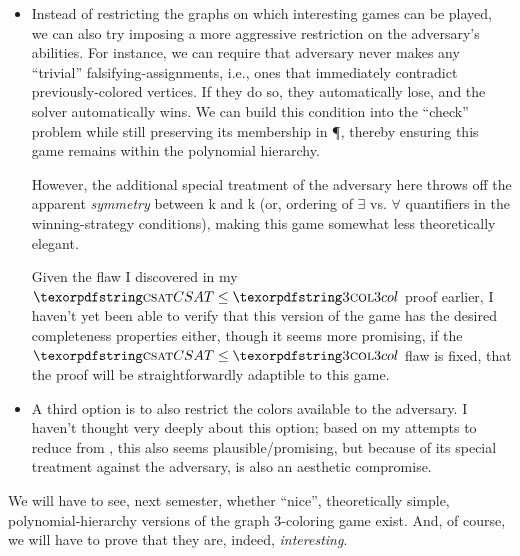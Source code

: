 \begin{itemize}
  \item Instead of restricting the graphs on which interesting games can be
    played, we can also try imposing a more aggressive restriction on the
    adversary's abilities.  For instance, we can require that adversary never
    makes any ``trivial'' falsifying-assignments, i.e., ones that immediately
    contradict previously-colored vertices.  If they do so, they automatically
    lose, and the solver automatically wins.  We can build this condition into
    the ``check'' problem while still preserving its membership in \P, thereby
    ensuring this game remains within the polynomial hierarchy.

    However, the additional special treatment of the adversary here throws off
    the apparent \emph{symmetry} between \SigmaP k and \PiP k (or, ordering of
    \(∃\) vs. \(∀\) quantifiers in the winning-strategy conditions), making
    this game somewhat less theoretically elegant.

    Given the flaw I discovered in my \(\CSAT\le\Problem{3col}\) proof earlier,
    I haven't yet been able to verify that this version of the game has the
    desired completeness properties either, though it seems more promising, if
    the \(\CSAT\le\Problem{3col}\) flaw is fixed, that the proof will be
    straightforwardly adaptible to this game.

  \item A third option is to also restrict the colors available to the
    adversary.  I haven't thought very deeply about this option; based on my
    attempts to reduce from \CSAT, this also seems plausible/promising, but
    because of its special treatment against the adversary, is also an
    aesthetic compromise.

\end{itemize}

We will have to see, next semester, whether ``nice'', theoretically simple,
polynomial-hierarchy versions of the graph \(3\)-coloring game exist.  And, of
course, we will have to prove that they are, indeed, \emph{interesting}.



%
%


